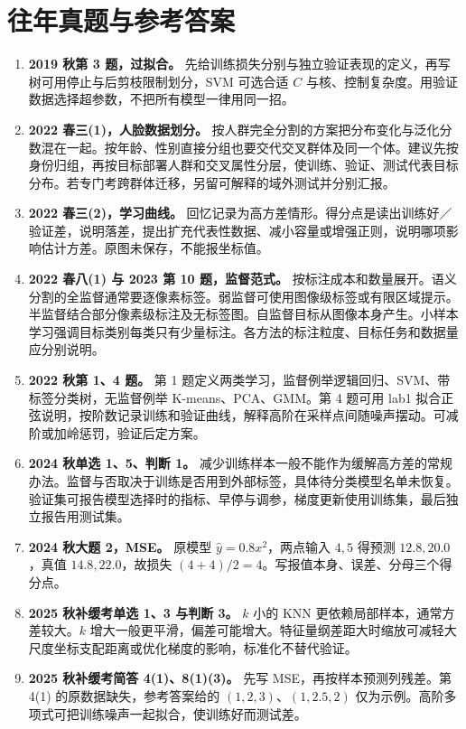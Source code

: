 \documentclass[UTF8,a4paper,zihao=-4,fontset=fandol]{ctexrep}
\begin{document}
\section{往年真题与参考答案}
\begin{enumerate}[leftmargin=2em]
\item \textbf{2019 秋第 3 题，过拟合。} 先给训练损失分别与独立验证表现的定义，再写树可用停止与后剪枝限制划分，SVM 可选合适 \(C\) 与核、控制复杂度。用验证数据选择超参数，不把所有模型一律用同一招。
\item \textbf{2022 春三(1)，人脸数据划分。} 按人群完全分割的方案把分布变化与泛化分数混在一起。按年龄、性别直接分组也要交代交叉群体及同一个体。建议先按身份归组，再按目标部署人群和交叉属性分层，使训练、验证、测试代表目标分布。若专门考跨群体迁移，另留可解释的域外测试并分别汇报。
\item \textbf{2022 春三(2)，学习曲线。} 回忆记录为高方差情形。得分点是读出训练好／验证差，说明落差，提出扩充代表性数据、减小容量或增强正则，说明哪项影响估计方差。原图未保存，不能报坐标值。
\item \textbf{2022 春八(1) 与 2023 第 10 题，监督范式。} 按标注成本和数量展开。语义分割的全监督通常要逐像素标签。弱监督可使用图像级标签或有限区域提示。半监督结合部分像素级标注及无标签图。自监督目标从图像本身产生。小样本学习强调目标类别每类只有少量标注。各方法的标注粒度、目标任务和数据量应分别说明。
\item \textbf{2022 秋第 1、4 题。} 第 1 题定义两类学习，监督例举逻辑回归、SVM、带标签分类树，无监督例举 K-means、PCA、GMM。第 4 题可用 lab1 拟合正弦说明，按阶数记录训练和验证曲线，解释高阶在采样点间随噪声摆动。可减阶或加岭惩罚，验证后定方案。
\item \textbf{2024 秋单选 1、5、判断 1。} 减少训练样本一般不能作为缓解高方差的常规办法。监督与否取决于训练是否用到外部标签，具体待分类模型名单未恢复。验证集可报告模型选择时的指标、早停与调参，梯度更新使用训练集，最后独立报告用测试集。
\item \textbf{2024 秋大题 2，MSE。} 原模型 \(\hat y=0.8x^2\)，两点输入 \(4,5\) 得预测 \(12.8,20.0\)，真值 \(14.8,22.0\)，故损失 \((4+4)/2=4\)。写报值本身、误差、分母三个得分点。
\item \textbf{2025 秋补缓考单选 1、3 与判断 3。} \(k\) 小的 KNN 更依赖局部样本，通常方差较大。\(k\) 增大一般更平滑，偏差可能增大。特征量纲差距大时缩放可减轻大尺度坐标支配距离或优化梯度的影响，标准化不替代验证。
\item \textbf{2025 秋补缓考简答 4(1)、8(1)(3)。} 先写 MSE，再按样本预测列残差。第 4(1) 的原数据缺失，参考答案给的 \((1,2,3)\)、\((1,2.5,2)\) 仅为示例。高阶多项式可把训练噪声一起拟合，使训练好而测试差。
\end{enumerate}
\end{document}
